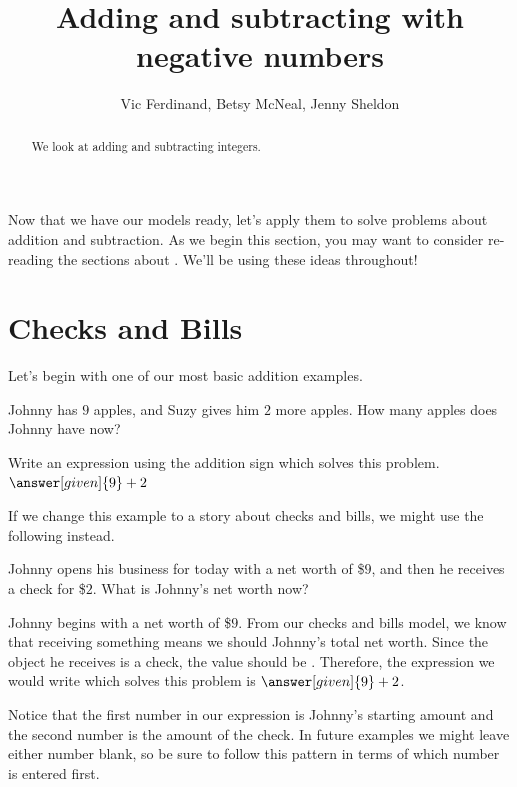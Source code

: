 \documentclass{ximera}
\title{Adding and subtracting with negative numbers}
\author{Vic Ferdinand, Betsy McNeal, Jenny Sheldon}
\begin{document}
\begin{abstract}
We look at adding and subtracting integers.
\end{abstract}
\maketitle

Now that we have our models ready, let's apply them to solve problems about addition and subtraction. 
As we begin this section, you may want to consider re-reading the sections about . 
We'll be using these ideas throughout!

\section{Checks and Bills}

Let's begin with one of our most basic addition examples.
\begin{example}
Johnny has $9$ apples, and Suzy gives him $2$ more apples.  How many apples does Johnny have now?  

\begin{prompt}
Write an expression using the addition sign which solves this problem.  $\answer[given]{9} + 2$
\end{prompt}
\end{example}

If we change this example to a story about checks and bills, we might use the following instead.
\begin{example}
Johnny opens his business for today with a net worth of \$$9$, and then he receives a check for \$$2$.  What is Johnny's net worth now?
\begin{explanation}
Johnny begins with a net worth of \$$9$.  From our checks and bills model, we know that receiving something means we should  Johnny's total net worth.  Since the object he receives is a check, the value should be .  Therefore, the expression we would write which solves this problem is $\answer[given]{9} + 2$. 

\end{explanation}
\end{example}

Notice that the first number in our expression is Johnny's starting amount and the second number is the amount of the check. In future examples we might leave either number blank, so be sure to follow this pattern in terms of which number is entered first.
\end{document}
